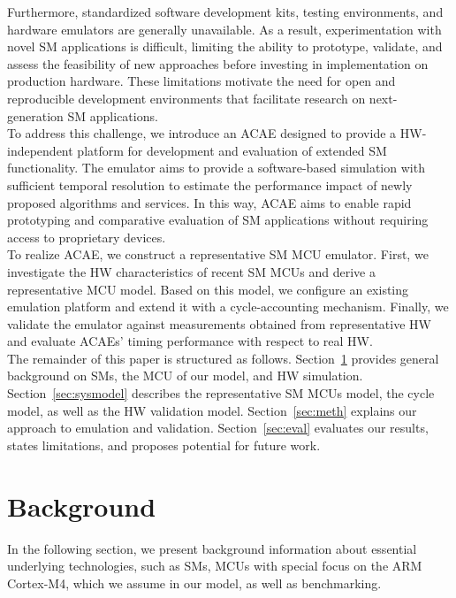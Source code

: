 \documentclass[english]{tudscrartcl}
\begin{document}
		Furthermore, standardized software development kits, testing environments, and hardware emulators are generally unavailable.
		As a result, experimentation with novel \ac{SM} applications is difficult, limiting the ability to prototype, validate, and assess the feasibility of new approaches before investing in implementation on production hardware.
		These limitations motivate the need for open and reproducible development environments that facilitate research on next-generation \ac{SM} applications.
		\\
		To address this challenge, we introduce an \ac{ACAE} designed to provide a \ac{HW}-independent platform for development and evaluation of extended \ac{SM} functionality.
		The emulator aims to provide a software-based simulation with sufficient temporal resolution to estimate the performance impact of newly proposed algorithms and services.
		In this way, \ac{ACAE} aims to enable rapid prototyping and comparative evaluation of \ac{SM} applications without requiring access to proprietary devices.
		\\
		To realize \ac{ACAE}, we construct a representative \ac{SM} \ac{MCU} emulator.
		First, we investigate the \ac{HW} characteristics of recent \ac{SM} \acp{MCU} and derive a representative \ac{MCU} model.
		Based on this model, we configure an existing emulation platform and extend it with a cycle-accounting mechanism.
		Finally, we validate the emulator against measurements obtained from representative \ac{HW} and evaluate \ac{ACAE}s' timing performance with respect to real \ac{HW}.
		\\
		The remainder of this paper is structured as follows.
		Section~\ref{sec:bg} provides general background on \acp{SM}, the \ac{MCU} of our model, and \ac{HW} simulation.
		Section~\ref{sec:sysmodel} describes the representative \ac{SM} \acp{MCU} model, the cycle model, as well as the \ac{HW} validation model.
		Section~\ref{sec:meth} explains our approach to emulation and validation.
		Section~\ref{sec:eval} evaluates our results, states limitations, and proposes potential for future work.

	\section{Background}
		\label{sec:bg}
		In the following section, we present background information about essential underlying technologies, such as \acp{SM}, \acp{MCU} with special focus on the ARM Cortex-M4, which we assume in our model, as well as benchmarking.
		\\
\end{document}
